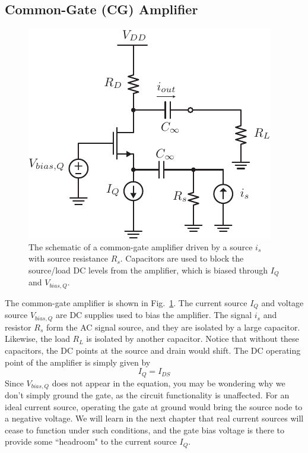 \subsection{Common-Gate (CG) Amplifier}
\begin{figure}[tb]
\centering
\includegraphics[scale=1]{cgamp_is}
\caption{The schematic of a common-gate amplifier driven by a source $i_s$ with source resistance $R_s$.  Capacitors are used to block the source/load DC levels from the amplifier, which is biased through $I_Q$ and $V_{bias,Q}$.}
\label{fig:cgamp_is}
\end{figure}
The common-gate amplifier is shown in Fig.~\ref{fig:cgamp_is}.  The current source $I_Q$ and voltage source $V_{bias,Q}$ are DC supplies used to bias the amplifier.  The signal $i_s$ and resistor $R_s$ form the AC signal source, and they are isolated by a large capacitor.  Likewise, the load $R_L$ is isolated by another capacitor.  Notice that without these capacitors, the DC points at the source and drain would shift.  The DC operating point of the amplifier is simply given by
\begin{equation}
	{I_Q} = {I_{DS}}
\end{equation}
Since $V_{bias,Q}$ does not appear in the equation, you may be wondering why we don't simply ground the gate, as the circuit functionality is unaffected.  For an ideal current source, operating the gate at ground would bring the source node to a negative voltage.  We will learn in the next chapter that real current sources will cease to function under such conditions, and the gate bias voltage is there to provide some ``headroom" to the current source $I_Q$.
